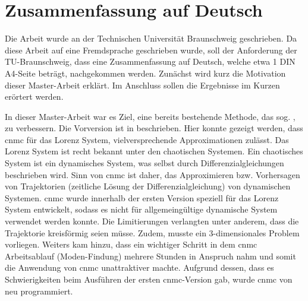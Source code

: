 \chapter{Zusammenfassung auf Deutsch}
Die Arbeit wurde an der Technischen Universität Braunschweig geschrieben.
Da diese Arbeit auf eine Fremdsprache geschrieben wurde, soll der Anforderung der TU-Braunschweig, dass eine Zusammenfassung auf Deutsch, welche etwa 1 DIN A4-Seite beträgt, nachgekommen werden.
Zunächst wird kurz die Motivation dieser Master-Arbeit erklärt. Im Anschluss sollen die Ergebnisse im Kurzen erörtert werden.\newline 

In dieser Master-Arbeit war es Ziel, eine bereits bestehende Methode, das sog. , zu verbessern. Die Vorversion ist in \cite{Max2021} beschrieben. Hier konnte gezeigt werden, dass \gls{cnmc} für das Lorenz System, \cite{lorenz1963deterministic} vielversprechende Approximationen zulässt.
Das Lorenz System ist recht bekannt unter den chaotischen Systemen. Ein chaotisches System ist ein dynamisches System, was selbst durch Differenzialgleichungen beschrieben wird. 
Sinn von \gls{cnmc} ist daher, das Approximieren bzw. Vorhersagen von Trajektorien (zeitliche Lösung der Differenzialgleichung) von  dynamischen Systemen. 
\gls{cnmc} wurde innerhalb der ersten Version speziell für das Lorenz System entwickelt, sodass es nicht für allgemeingültige dynamische System verwendet werden konnte.
Die Limitierungen verlangten unter anderem, dass die Trajektorie kreisförmig seien müsse. Zudem, musste ein 3-dimensionales Problem vorliegen. Weiters kam hinzu, dass ein wichtiger Schritt in dem \gls{cnmc} Arbeitsablauf (Moden-Findung) mehrere Stunden in Anspruch nahm und somit die Anwendung von \gls{cnmc} unattraktiver machte. 
Aufgrund dessen, dass es Schwierigkeiten beim Ausführen der ersten \gls{cnmc}-Version gab, wurde \gls{cnmc} von neu programmiert.\newline


